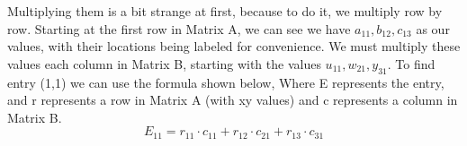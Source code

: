 \documentclass[final,1p,12pt]{elsarticle}
\begin{document}
        Multiplying them is a bit strange at first, because to do it, we multiply row by row. Starting at the first row in Matrix A, we can see we have $a_{11},b_{12},c_{13}$ as our values, with their locations being labeled for convenience.  We must multiply these values each column in Matrix B, starting with the values $u_{11},w_{21},y_{31}$. To find entry (1,1) we can use the formula shown below, Where E represents the entry, and r represents a row in Matrix A (with xy values) and c represents a column in Matrix B.
        \begin{equation}
            E_{11} = r_{11} \cdot c_{11}  +  r_{12} \cdot c_{21}  +   r_{13} \cdot c_{31}
        \end{equation}
        
        
    
\clearpage\appendix





    
\end{document}
